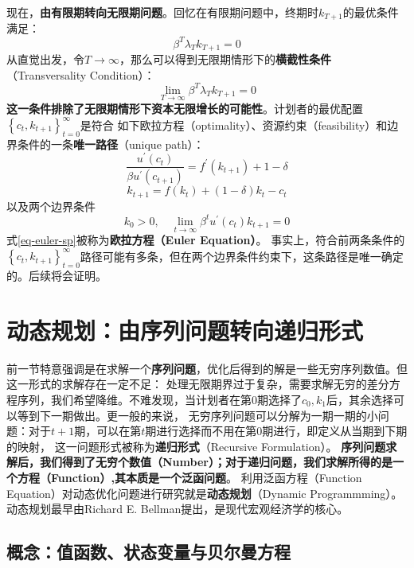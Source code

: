 现在，\textbf{由有限期转向无限期问题}。回忆在有限期问题中，终期时$k_{T+1}$的最优条件满足：
$$\beta^T \lambda_T k_{T+1}=0$$
从直觉出发，令$T \rightarrow \infty$，那么可以得到无限期情形下的\textbf{横截性条件}（Transversality Condition）：
\begin{equation}
    \lim _{T \rightarrow \infty} \beta^T \lambda_T k_{T+1}=0
\end{equation}
\textbf{这一条件排除了无限期情形下资本无限增长的可能性}。计划者的最优配置$\left\{c_t, k_{t+1}\right\}_{t=0}^{\infty}$是符合
如下欧拉方程（optimality）、资源约束（feasibility）和边界条件的一条\textbf{唯一路径}（unique path）：
\begin{equation}    \label{eq-euler-sp}
    \frac{u^{\prime}\left(c_t\right)}{\beta u^{\prime}\left(c_{t+1}\right)}=f^{\prime}\left(k_{t+1}\right)+1-\delta
\end{equation}
\begin{equation}    \label{eq-res-const-sp}
    k_{t+1}=f\left(k_t\right)+(1-\delta) k_t-c_t
\end{equation}
以及两个边界条件
$$
k_0>0, \quad \lim _{t \rightarrow \infty} \beta^t u^{\prime}\left(c_t\right) k_{t+1}=0
$$
式\eqref{eq-euler-sp}被称为\textbf{欧拉方程（Euler Equation）}。
事实上，符合前两条条件的$\left\{c_t, k_{t+1}\right\}_{t=0}^{\infty}$路径可能有多条，但在两个边界条件约束下，这条路径是唯一确定的。后续将会证明。


\section{动态规划：由序列问题转向递归形式}  \label{sec-sp-fe}

前一节特意强调是在求解一个\textbf{序列问题}，优化后得到的解是一些无穷序列数值。但这一形式的求解存在一定不足：
处理无限期界过于复杂，需要求解无穷的差分方程序列，我们希望降维。不难发现，当计划者在第0期选择了$c_0,k_1$后，其余选择可以等到下一期做出。更一般的来说，
无穷序列问题可以分解为一期一期的小问题：对于$t+1$期，可以在第$t$期进行选择而不用在第0期进行，即定义从当期到下期的映射，
这一问题形式被称为\textbf{递归形式}（Recursive Formulation）。
\textbf{序列问题求解后，我们得到了无穷个数值（Number）；对于递归问题，我们求解所得的是一个方程（Function）,其本质是一个泛函问题}。
利用泛函方程（Function Equation）对动态优化问题进行研究就是\textbf{动态规划}（Dynamic Programmming）。
动态规划最早由Richard E. Bellman提出，是现代宏观经济学的核心。


\subsection{概念：值函数、状态变量与贝尔曼方程} \label{subsec-dp-concept}

